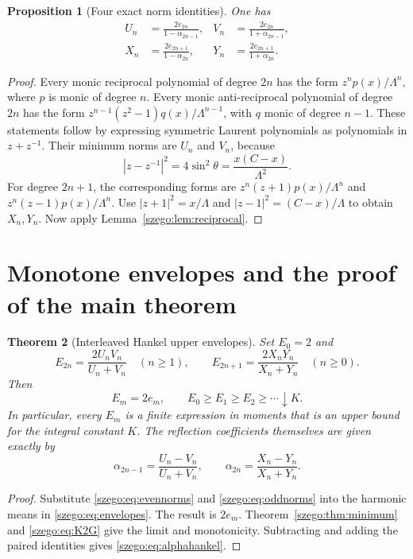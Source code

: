 \documentclass[11pt,a4paper]{article}
\numberwithin{equation}{section}
\newtheorem{theorem}{Theorem}[section]
\newtheorem{proposition}[theorem]{Proposition}
\theoremstyle{remark}\newtheorem{remark}[theorem]{Remark}
\newcommand{\Lam}{\Lambda}
\begin{document}
\begin{proposition}[Four exact norm identities]\label{szego:prop:four}
One has
\begin{align}
 U_n&=\frac{2e_{2n}}{1-\alpha_{2n-1}},
 &V_n&=\frac{2e_{2n}}{1+\alpha_{2n-1}},\label{szego:eq:evennorms}\\
 X_n&=\frac{2e_{2n+1}}{1-\alpha_{2n}},
 &Y_n&=\frac{2e_{2n+1}}{1+\alpha_{2n}}.\label{szego:eq:oddnorms}
\end{align}
\end{proposition}
\begin{proof}
Every monic reciprocal polynomial of degree $2n$ has the form
$z^np(x)/\Lam^n$, where $p$ is monic of degree $n$.
Every monic anti-reciprocal polynomial of degree $2n$ has the form
$z^{n-1}(z^2-1)q(x)/\Lam^{n-1}$, with $q$ monic of degree $n-1$.
These statements follow by expressing symmetric Laurent polynomials as
polynomials in $z+z^{-1}$.
Their minimum norms are $U_n$ and $V_n$, because
\[
 |z-z^{-1}|^2=4\sin^2\theta=\frac{x(C-x)}{\Lam^2}.
\]
For degree $2n+1$, the corresponding forms are
$z^n(z+1)p(x)/\Lam^n$ and $z^n(z-1)p(x)/\Lam^n$.
Use
$|z+1|^2=x/\Lam$ and $|z-1|^2=(C-x)/\Lam$ to obtain $X_n,Y_n$.
Now apply Lemma~\ref{szego:lem:reciprocal}.
\end{proof}

\section{Monotone envelopes and the proof of the main theorem}
\label{szego:sec:envelopes}
\begin{theorem}[Interleaved Hankel upper envelopes]\label{szego:thm:envelope}
Set $E_0=2$ and
\begin{equation}\label{szego:eq:envelopes}
 E_{2n}=\frac{2U_nV_n}{U_n+V_n}\quad(n\geq1),\qquad
 E_{2n+1}=\frac{2X_nY_n}{X_n+Y_n}\quad(n\geq0).
\end{equation}
Then
\begin{equation}\label{szego:eq:envelopemain}
 E_m=2e_m,\qquad E_0\geq E_1\geq E_2\geq\cdots\downarrow K.
\end{equation}
In particular, every $E_m$ is a finite expression in moments that is an upper
bound for the integral constant $K$.
The reflection coefficients themselves are given exactly by
\begin{equation}\label{szego:eq:alphahankel}
 \alpha_{2n-1}=\frac{U_n-V_n}{U_n+V_n},\qquad
 \alpha_{2n}=\frac{X_n-Y_n}{X_n+Y_n}.
\end{equation}
\end{theorem}
\begin{proof}
Substitute \eqref{szego:eq:evennorms} and \eqref{szego:eq:oddnorms} into the harmonic
means in \eqref{szego:eq:envelopes}. The result is $2e_m$.
Theorem~\ref{szego:thm:minimum} and \eqref{szego:eq:K2G} give the limit and monotonicity.
Subtracting and adding the paired identities gives \eqref{szego:eq:alphahankel}.
\end{proof}
\end{document}
